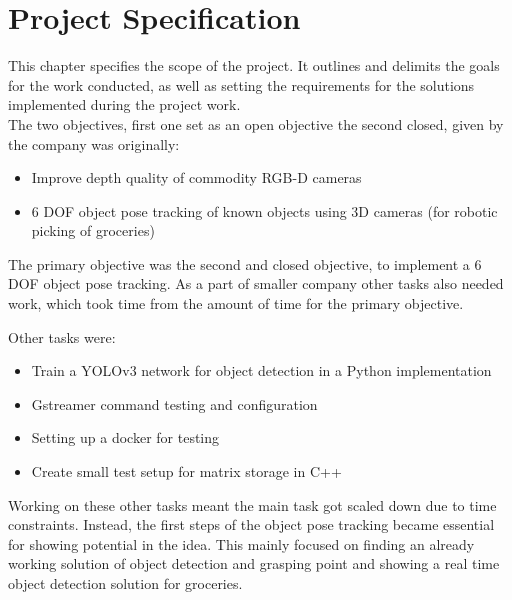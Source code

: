 \chapter{Project Specification}\label{ch:projecspec}\glsresetall
This chapter specifies the scope of the project. It outlines and delimits the goals for the work conducted, as well as setting the requirements for the solutions implemented during the project work. \\

The two objectives, first one set as an open objective the second closed, given by the company was originally:
\begin{itemize}
	\item Improve depth quality of commodity RGB-D cameras
	\item 6 DOF object pose tracking of known objects using 3D cameras (for robotic picking of groceries)
\end{itemize}

The primary objective was the second and closed objective, to implement a 6 DOF object pose tracking.
As a part of smaller company other tasks also needed work, which took time from the amount of time for the primary objective. 

Other tasks were:
\begin{itemize}
	\item Train a YOLOv3 network for object detection in a Python implementation
	\item Gstreamer command testing and configuration
	\item Setting up a docker for testing
	\item Create small test setup for matrix storage in C++
\end{itemize}

Working on these other tasks meant the main task got scaled down due to time constraints. Instead, the first steps of the object pose tracking became essential for showing potential in the idea. This mainly focused on finding an already working solution of object detection and grasping point and showing a real time object detection solution for groceries.